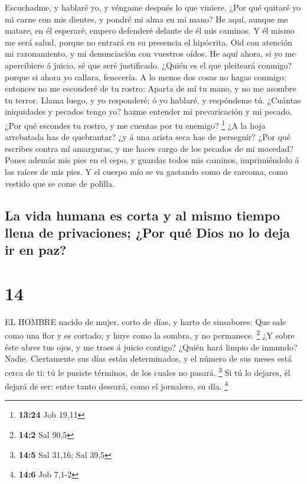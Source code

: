  Escuchadme, y hablaré yo, y véngame después lo que
viniere.  ¿Por qué quitaré yo mi carne con mis dientes, y
pondré mi alma en mi mano?  He aquí, aunque me matare, en
él esperaré; empero defenderé delante de él mis caminos.  Y
él mismo me será salud, porque no entrará en su presencia el hipócrita.
 Oid con atención mi razonamiento, y mi denunciación con
vuestros oídos.  He aquí ahora, si yo me apercibiere á
juicio, sé que seré justificado.  ¿Quién es el que
pleiteará conmigo? porque si ahora yo callara, fenecería. 
A lo menos dos cosas no hagas conmigo; entonces no me esconderé de tu
rostro:  Aparta de mí tu mano, y no me asombre tu terror.
 Llama luego, y yo responderé; ó yo hablaré, y respóndeme
tú.  ¿Cuántas iniquidades y pecados tengo yo? hazme
entender mi prevaricación y mi pecado.  ¿Por qué escondes
tu rostro, y me cuentas por tu enemigo? \footnote{\textbf{13:24} Job
  19,11}  ¿A la hoja arrebatada has de quebrantar? ¿y á una
arista seca has de perseguir?  ¿Por qué escribes contra mí
amarguras, y me haces cargo de los pecados de mi mocedad? 
Pones además mis pies en el cepo, y guardas todos mis caminos,
imprimiéndolo á las raíces de mis pies.  Y el cuerpo mío se
va gastando como de carcoma, como vestido que se come de polilla.

\hypertarget{la-vida-humana-es-corta-y-al-mismo-tiempo-llena-de-privaciones-por-quuxe9-dios-no-lo-deja-ir-en-paz}{%
\subsection{La vida humana es corta y al mismo tiempo llena de
privaciones; ¿Por qué Dios no lo deja ir en
paz?}\label{la-vida-humana-es-corta-y-al-mismo-tiempo-llena-de-privaciones-por-quuxe9-dios-no-lo-deja-ir-en-paz}}

\hypertarget{section-13}{%
\section{14}\label{section-13}}

 EL HOMBRE nacido de mujer, corto de días, y harto de
sinsabores:  Que sale como una flor y es cortado; y huye
como la sombra, y no permanece. \footnote{\textbf{14:2} Sal 90,5}
 ¿Y sobre éste abres tus ojos, y me traes á juicio contigo?
 ¿Quién hará limpio de inmundo? Nadie. 
Ciertamente sus días están determinados, y el número de sus meses está
cerca de ti: tú le pusiste términos, de los cuales no pasará.
\footnote{\textbf{14:5} Sal 31,16; Sal 39,5}  Si tú lo
dejares, él dejará de ser: entre tanto deseará, como el jornalero, su
día. \footnote{\textbf{14:6} Job 7,1-2}

